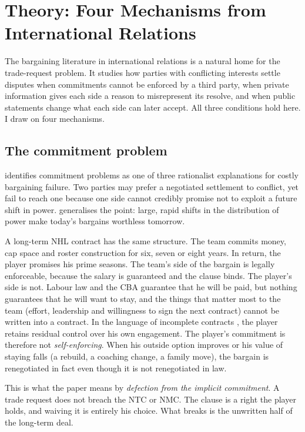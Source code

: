 \section{Theory: Four Mechanisms from International Relations}\label{sec:theory}

The bargaining literature in international relations is a natural home for the trade-request problem. It studies how parties with conflicting interests settle disputes when commitments cannot be enforced by a third party, when private information gives each side a reason to misrepresent its resolve, and when public statements change what each side can later accept. All three conditions hold here. I draw on four mechanisms.

\subsection{The commitment problem}

\citet{fearon1995} identifies commitment problems as one of three rationalist explanations for costly bargaining failure. Two parties may prefer a negotiated settlement to conflict, yet fail to reach one because one side cannot credibly promise not to exploit a future shift in power. \citet{powell2006} generalises the point: large, rapid shifts in the distribution of power make today's bargains worthless tomorrow.

A long-term NHL contract has the same structure. The team commits money, cap space and roster construction for six, seven or eight years. In return, the player promises his prime seasons. The team's side of the bargain is legally enforceable, because the salary is guaranteed and the clause binds. The player's side is not. Labour law and the CBA guarantee that he will be paid, but nothing guarantees that he will want to stay, and the things that matter most to the team (effort, leadership and willingness to sign the next contract) cannot be written into a contract. In the language of incomplete contracts \citep{hartmoore1988,hartmoore1990}, the player retains residual control over his own engagement. The player's commitment is therefore not \emph{self-enforcing}. When his outside option improves or his value of staying falls (a rebuild, a coaching change, a family move), the bargain is renegotiated in fact even though it is not renegotiated in law.

This is what the paper means by \emph{defection from the implicit commitment}. A trade request does not breach the NTC or NMC. The clause is a right the player holds, and waiving it is entirely his choice. What breaks is the unwritten half of the long-term deal.

